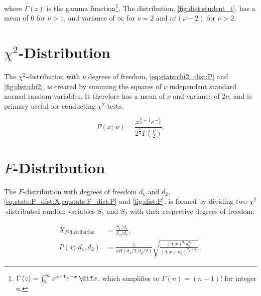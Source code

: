 \noindent where $\Gamma\left(z\right)$ is the gamma function\footnote{$\Gamma\left(z\right) = \int_{0}^{\infty} x^{z-1} e^{-x} \, \dif x$,
which simplifies to $\Gamma\left(n\right)=\left(n-1\right)!$ for integer $n$.}.
The distribution, \cref{fig:dist:student_t}, has a mean of \num{0} for $\nu > 1$,
and variance of $\infty$ for $\nu =2$ and $\nu / \left(\nu-2\right)$ for $\nu > 2$.

\section{\texorpdfstring{$\chi^{2}$-Distribution}{Chi-Squared Distribution}}
\label{stats:chi2_dist}

The $\chi^{2}$-distribution with $\nu$ degrees of freedom,
\cref{eq:stats:chi2_dist:P} and \cref{fig:dist:chi2},
is created by summing the squares of $\nu$ independent standard normal random variables.
It therefore has a mean of $\nu$ and variance of $2\nu$, and is
primary useful for conducting $\chi^{2}$-tests.

\begin{equation}\label{eq:stats:chi2_dist:P}
P\left(x;\,\nu\right) = \frac{
x^{\frac{\nu}{2} - 1} e^{-\frac{x}{2}}
}{
2^{\frac{\nu}{2}} \Gamma\left(\frac{\nu}{2}\right)}.
\end{equation}

\section{\texorpdfstring{$F$}{F}-Distribution}
\label{stats:F_dist}

The $F$-distribution with degrees of freedom $d_{1}$ and $d_{2}$,
\cref{eq:stats:F_dist:X,eq:stats:F_dist:P} and \cref{fig:dist:F},
is formed by dividing two $\chi^{2}$-distributed random variables
$S_{1}$ and $S_{2}$ with their respective degrees of freedom:

\begin{subequations}\label{eq:stats:F_dist}
\begin{align}
X_{F\text{-distribution}} &= \frac{S_{1}/d_{1}}{S_{2}/d_{2}}, \label{eq:stats:F_dist:X} \\
P\left(x;\,d_{1},d_{2}\right) &= \frac{1}{x B\left(d_{1}/2, d_{2}/2\right)} \sqrt{\frac{\left(d_{1} x\right)^{d_{1}} d_{2}^{d_{2}}}{\left(d_{1} x + d_{2}\right)^{d_{1}+d_{2}}}}, \label{eq:stats:F_dist:P}
\end{align}
\end{subequations}

